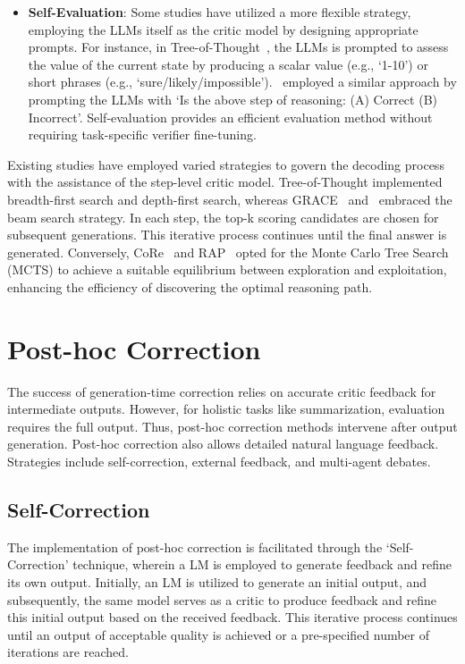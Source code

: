 \documentclass[a4paper,oneside]{book}
\begin{document}
\begin{itemize}
    \item \textbf{Self-Evaluation}: Some studies have utilized a more flexible strategy, employing the LLMs itself as the critic model by designing appropriate prompts. For instance, in Tree-of-Thought~\cite{yao2023tree}, the LLMs is prompted to assess the value of the current state by producing a scalar value (e.g., `1-10') or short phrases (e.g., `sure/likely/impossible').~\cite{xie2023selfevaluation} employed a similar approach by prompting the LLMs with `Is the above step of reasoning: (A) Correct (B) Incorrect'. Self-evaluation provides an efficient evaluation method without requiring task-specific verifier fine-tuning.
\end{itemize}

Existing studies have employed varied strategies to govern the decoding process with the assistance of the step-level critic model. Tree-of-Thought implemented breadth-first search and depth-first search, whereas GRACE~\cite{khalifa2023grace} and~\cite{xie2023selfevaluation} embraced the beam search strategy. In each step, the top-k scoring candidates are chosen for subsequent generations. This iterative process continues until the final answer is generated. Conversely, CoRe~\cite{zhu-etal-2023-solving} and RAP~\cite{hao2023reasoning} opted for the Monte Carlo Tree Search (MCTS) to achieve a suitable equilibrium between exploration and exploitation, enhancing the efficiency of discovering the optimal reasoning path.

\section{Post-hoc Correction}
The success of generation-time correction relies on accurate critic feedback for intermediate outputs. However, for holistic tasks like summarization, evaluation requires the full output. Thus, post-hoc correction methods intervene after output generation. Post-hoc correction also allows detailed natural language feedback. Strategies include self-correction, external feedback, and multi-agent debates.

\subsection{Self-Correction}
The implementation of post-hoc correction is facilitated through the `Self-Correction' technique, wherein a LM is employed to generate feedback and refine its own output. Initially, an LM is utilized to generate an initial output, and subsequently, the same model serves as a critic to produce feedback and refine this initial output based on the received feedback. This iterative process continues until an output of acceptable quality is achieved or a pre-specified number of iterations are reached.
\end{document}
